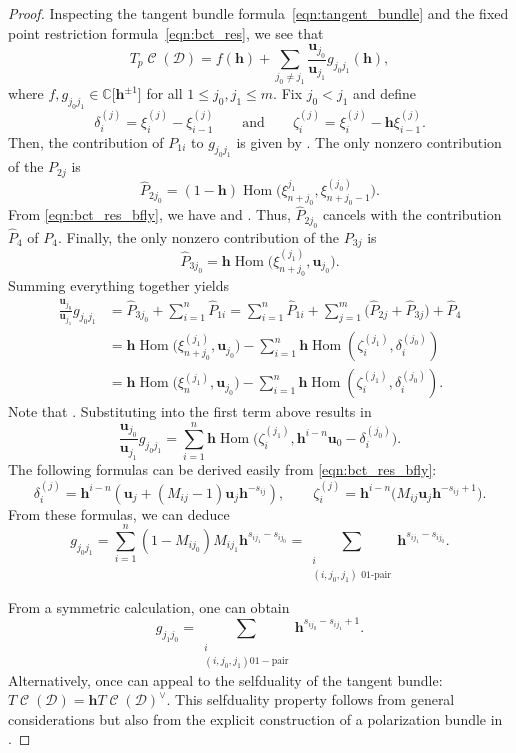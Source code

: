 \documentclass[pdftex]{sigma}
\numberwithin{equation}{section}
\newcommand{\brane}{\mathcal D}
\newcommand{\CC}{\mathbb C}
\newcommand{\hb}{\mathbf h}
\newcommand{\ub}{\mathbf u}
\DeclareMathOperator{\bowvar}{\mathcal C}
\DeclareMathOperator{\Hom}{Hom}
\begin{document}
\begin{proof}
Inspecting the tangent bundle formula~\eqref{eqn:tangent_bundle} and the fixed point restriction formula~\eqref{eqn:bct_res}, we see that
\[
T_p\bowvar(\brane) = f(\hb) + \sum_{j_0 \neq j_1} \frac{\ub_{j_0}}{\ub_{j_1}} g_{j_0j_1}(\hb),
\]
where $f, g_{j_0j_1} \in \CC\big[\hb^{\pm 1}\big]$ for all $1\leq j_0, j_1 \leq m$. Fix $j_0 < j_1$ and define
\[
\delta_i^{(j)} = \xi_i^{(j)} - \xi_{i-1}^{(j)} \qquad \text{and} \qquad
\zeta_i^{(j)} = \xi_i^{(j)} - \hb\xi_{i-1}^{(j)}.
\] Then, the contribution of $P_{1i}$ to $g_{j_0j_1}$ is given by \smash{$\hat{P}_{1i} = -\hb\Hom\bigl(\zeta_i^{(j_1)}, \delta_i^{(j_0)}\bigr)$}.
The only nonzero contribution of the $P_{2j}$ is
\[
\hat{P}_{2j_0} = (1-\hb)\Hom\bigl(\xi_{n+j_0}^{j_1}, \xi_{n+j_0 - 1}^{(j_0)}\bigr).
\]
 From \eqref{eqn:bct_res_bfly}, we have  and . Thus, $\hat{P}_{2j_0}$ cancels with the contribution~$\hat{P}_4$ of $P_4$. Finally, the only nonzero contribution of the $P_{3j}$ is
 \[
 \hat{P}_{3j_0} = \hb\Hom\bigl(\xi_{n+j_0}^{(j_1)}, \ub_{j_0}\bigr).
 \] Summing everything together yields
\begin{align*}
\frac{\ub_{j_0}}{\ub_{j_1}}g_{j_0j_1} &= \hat{P}_{3j_0} + \sum_{i=1}^n \hat{P}_{1i}
= \sum_{i=1}^n \hat{P}_{1i} + \sum_{j=1}^m \bigl( \hat{P}_{2j} + \hat{P}_{3j} \bigr) + \hat{P}_4 \\
&= \hb\Hom\bigl(\xi_{n+j_0}^{(j_1)}, \ub_{j_0}\bigr) - \sum_{i=1}^n \hb\Hom(\zeta_i^{(j_1)}, \delta_i^{(j_0)}) \\
&= \hb\Hom\bigl(\xi_n^{(j_1)}, \ub_{j_0}\bigr) -\sum_{i=1}^n \hb\Hom(\zeta_i^{(j_1)}, \delta_i^{(j_0)}).
\end{align*}
Note that \smash{$\xi_n^{(j)} = \sum_{i=1}^n \hb^{n-i}\zeta_i^{(j)}$}. Substituting into the first term above results in
\[
\frac{\ub_{j_0}}{\ub_{j_1}}g_{j_0j_1} = \sum_{i=1}^n\hb\Hom\bigl(\zeta_i^{(j_1)}, \hb^{i-n}\ub_0 - \delta_i^{(j_0)}\bigr).
\]
The following formulas can be derived easily from \eqref{eqn:bct_res_bfly}:
\[
\delta_i^{(j)} = \hb^{i-n}(\ub_j + (M_{ij} - 1)\ub_j\hb^{-s_{ij}}),\qquad \zeta_i^{(j)} = \hb^{i-n} \bigl(M_{ij}\ub_j\hb^{-s_{ij}+1}\bigr).
\]
From these formulas, we can deduce
\[
g_{j_0j_1} = \sum_{i=1}^n (1-M_{ij_0})M_{ij_1}\hb^{s_{ij_1}-s_{ij_0}} = \sum_{\substack{i \\ (i, j_0, j_1) \text{ 01-pair}}} \hb^{s_{ij_1}-s_{ij_0}}.
\]

From a symmetric calculation, one can obtain
\[
g_{j_1j_0} = \sum_{\substack{i \\ (i, j_0, j_1) \mathrm{01-pair}}} \hb^{s_{ij_0}-s_{ij_1}+1}.
\]
Alternatively, once can appeal to the selfduality of the tangent bundle: $T\bowvar(\brane) = \hb T\bowvar(\brane)^\vee$. This selfduality property follows from general considerations but also from the explicit construction of a polarization bundle in \cite[Section~4.4.2]{S}.


\end{proof}
\end{document}
